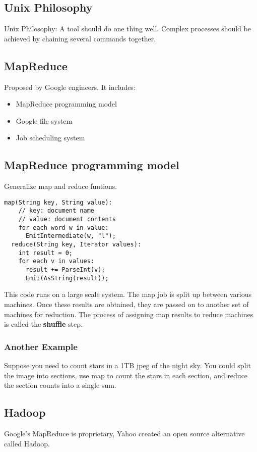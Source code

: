 \documentclass[12pt]{article}
\begin{document}
\subsection{Unix Philosophy}
Unix Philosophy: A tool should do one thing well. Complex processes should be
achieved by chaining several commands together.

\subsection{MapReduce}
Proposed by Google engineers. It includes:
\begin{itemize}
  \item {MapReduce programming model}
  \item {Google file system}
  \item {Job scheduling system}
\end{itemize}

\subsection {MapReduce programming model}
Generalize map and reduce funtions.
\begin{lstlisting}[caption=mapreduce example]
  map(String key, String value):
    // key: document name
    // value: document contents
    for each word w in value:
      EmitIntermediate(w, "l");
  reduce(String key, Iterator values):
    int result = 0;
    for each v in values:
      result += ParseInt(v);
      Emit(AsString(result));
\end{lstlisting}
This code runs on a large scale system. The map job is split up between
various machines. Once these results are obtained, they are passed on to
another set of machines for reduction. The process of assigning map results to
reduce machines is called the \textbf{shuffle} step.

\subsubsection{Another Example}
Suppose you need to count stars in a 1TB jpeg of the night sky. You could split
the image into sections, use map to count the stars in each section, and reduce
the section counts into a single sum.

\subsection{Hadoop}
Google's MapReduce is proprietary, Yahoo created an open source alternative
called Hadoop.
\end{document}
